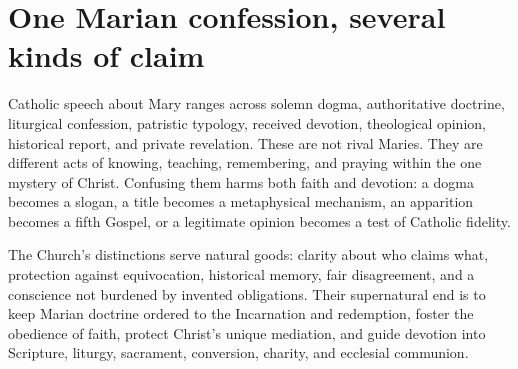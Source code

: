 \section{One Marian confession, several kinds of claim}

Catholic speech about Mary ranges across solemn dogma, authoritative doctrine,
liturgical confession, patristic typology, received devotion, theological
opinion, historical report, and private revelation. These are not rival
Maries. They are different acts of knowing, teaching, remembering, and praying
within the one mystery of Christ. Confusing them harms both faith and devotion:
a dogma becomes a slogan, a title becomes a metaphysical mechanism, an
apparition becomes a fifth Gospel, or a legitimate opinion becomes a test of
Catholic fidelity.

The Church's distinctions serve natural goods: clarity about who claims what,
protection against equivocation, historical memory, fair disagreement, and a
conscience not burdened by invented obligations. Their supernatural end is to
keep Marian doctrine ordered to the Incarnation and redemption, foster the
obedience of faith, protect Christ's unique mediation, and guide devotion into
Scripture, liturgy, sacrament, conversion, charity, and ecclesial communion.

